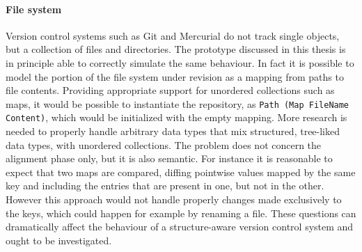 \documentclass[../Thesis.tex]{subfiles}
\begin{document}
	\paragraph{File system}
	Version control systems such as Git \cite{GIT} and Mercurial 
	\cite{HG} do not track single objects, but a collection of files and 
	directories. The prototype discussed in this thesis is in principle able
	to correctly simulate the same behaviour. In fact it is possible to
	model the portion of the file system under revision as a mapping
	from paths to file contents. Providing appropriate support 
	for unordered collections such as maps, it would be 
	possible to instantiate the repository, 
	as \texttt{Path (Map FileName Content)}, which would be initialized
	with the empty mapping.
	More research is needed to properly handle arbitrary data types that 
	mix structured, tree-liked data types, with unordered collections.
	The problem does not concern the alignment phase only, but it is 
	also semantic.
	For instance it is reasonable to expect that two maps are compared,
	diffing pointwise values mapped by the same key and including
	the entries that are present in one, but not in the other.
	However this approach would not handle properly changes made
	exclusively to the keys, which could happen for example 
	by renaming a file.
	These questions can dramatically affect the behaviour of a 
	structure-aware version control	system and ought to be investigated.

		
	
 	
\end{document}
